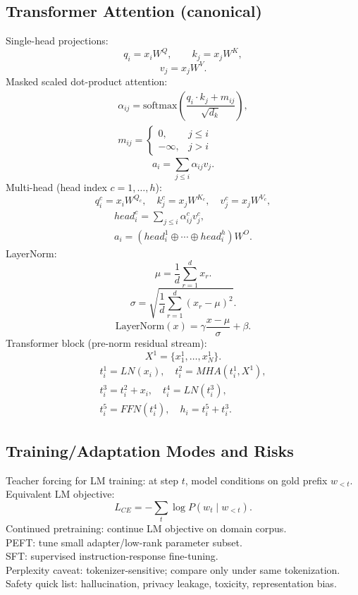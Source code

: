\subsection*{Transformer Attention (canonical)}
Single-head projections:
\[
q_i=x_iW^Q,\qquad k_j=x_jW^K,
\]
\[
v_j=x_jW^V.
\]
Masked scaled dot-product attention:
\[
\begin{array}{l}
\alpha_{ij}=\mathrm{softmax}\!\left(
\dfrac{q_i\cdot k_j+m_{ij}}{\sqrt{d_k}}
\right),\\
m_{ij}=
\begin{cases}
0,&j\le i\\
-\infty,&j>i
\end{cases}
\end{array}
\]
\[
a_i=\sum_{j\le i}\alpha_{ij}v_j.
\]
Multi-head (head index $c=1,\ldots,h$):
\[
q_i^c=x_iW^{Q_c},\quad
k_j^c=x_jW^{K_c},\quad
v_j^c=x_jW^{V_c},
\]
\[
\begin{array}{l}
head_i^c=\sum_{j\le i}\alpha_{ij}^c v_j^c,\\
a_i=(head_i^1\oplus\cdots\oplus head_i^h)W^O.
\end{array}
\]
LayerNorm:
\[
\mu=\frac{1}{d}\sum_{r=1}^{d}x_r.
\]
\[
\sigma=\sqrt{\frac{1}{d}\sum_{r=1}^{d}(x_r-\mu)^2}.
\]
\[
\mathrm{LayerNorm}(x)=\gamma\frac{x-\mu}{\sigma}+\beta.
\]
Transformer block (pre-norm residual stream):
\[
X^1=\{x_1^1,\ldots,x_N^1\}.
\]
\[
\begin{array}{l}
t_i^1=LN(x_i),\quad t_i^2=MHA(t_i^1,X^1),\\
t_i^3=t_i^2+x_i,\quad t_i^4=LN(t_i^3),\\
t_i^5=FFN(t_i^4),\quad h_i=t_i^5+t_i^3.
\end{array}
\]

\subsection*{Training/Adaptation Modes and Risks}
Teacher forcing for LM training: at step $t$, model conditions on gold prefix $w_{<t}$.\\
Equivalent LM objective:
\[
L_{CE}=-\sum_t \log P(w_t\mid w_{<t}).
\]
Continued pretraining: continue LM objective on domain corpus.\\
PEFT: tune small adapter/low-rank parameter subset.\\
SFT: supervised instruction-response fine-tuning.\\
Perplexity caveat: tokenizer-sensitive; compare only under same tokenization.\\
Safety quick list: hallucination, privacy leakage, toxicity, representation bias.

